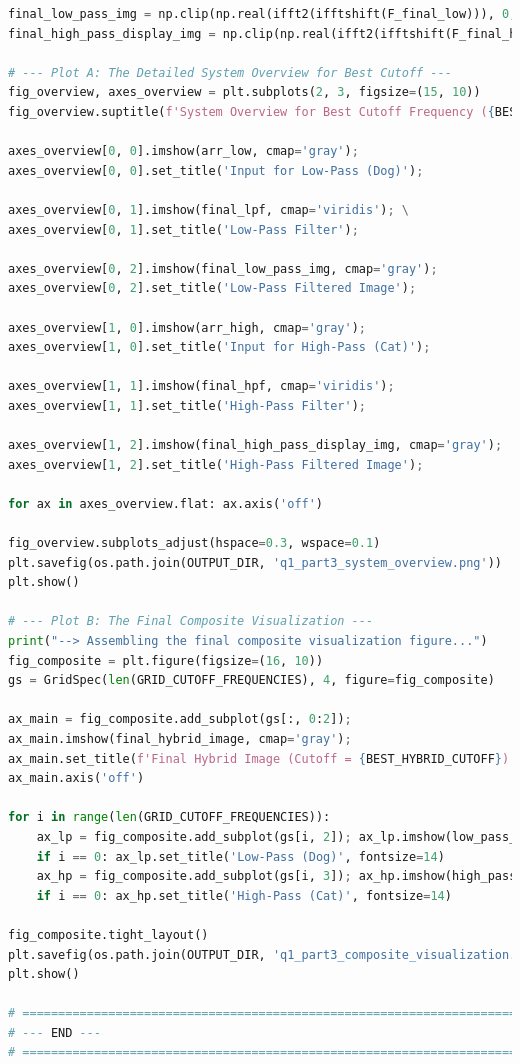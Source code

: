 \documentclass[11pt, a4paper]{article}
\begin{document}
\begin{lstlisting}[language=Python, caption={Python script for Question 1.}]
final_low_pass_img = np.clip(np.real(ifft2(ifftshift(F_final_low))), 0, 255)
final_high_pass_display_img = np.clip(np.real(ifft2(ifftshift(F_final_high))) + 128, 0, 255)

# --- Plot A: The Detailed System Overview for Best Cutoff ---
fig_overview, axes_overview = plt.subplots(2, 3, figsize=(15, 10))
fig_overview.suptitle(f'System Overview for Best Cutoff Frequency ({BEST_HYBRID_CUTOFF})', fontsize=16)

axes_overview[0, 0].imshow(arr_low, cmap='gray'); 
axes_overview[0, 0].set_title('Input for Low-Pass (Dog)');

axes_overview[0, 1].imshow(final_lpf, cmap='viridis'); \
axes_overview[0, 1].set_title('Low-Pass Filter');

axes_overview[0, 2].imshow(final_low_pass_img, cmap='gray'); 
axes_overview[0, 2].set_title('Low-Pass Filtered Image');

axes_overview[1, 0].imshow(arr_high, cmap='gray'); 
axes_overview[1, 0].set_title('Input for High-Pass (Cat)');

axes_overview[1, 1].imshow(final_hpf, cmap='viridis'); 
axes_overview[1, 1].set_title('High-Pass Filter');

axes_overview[1, 2].imshow(final_high_pass_display_img, cmap='gray'); 
axes_overview[1, 2].set_title('High-Pass Filtered Image');

for ax in axes_overview.flat: ax.axis('off')

fig_overview.subplots_adjust(hspace=0.3, wspace=0.1) 
plt.savefig(os.path.join(OUTPUT_DIR, 'q1_part3_system_overview.png'))
plt.show()

# --- Plot B: The Final Composite Visualization ---
print("--> Assembling the final composite visualization figure...")
fig_composite = plt.figure(figsize=(16, 10))
gs = GridSpec(len(GRID_CUTOFF_FREQUENCIES), 4, figure=fig_composite)

ax_main = fig_composite.add_subplot(gs[:, 0:2]); 
ax_main.imshow(final_hybrid_image, cmap='gray');
ax_main.set_title(f'Final Hybrid Image (Cutoff = {BEST_HYBRID_CUTOFF})', fontsize=16); 
ax_main.axis('off')

for i in range(len(GRID_CUTOFF_FREQUENCIES)):
    ax_lp = fig_composite.add_subplot(gs[i, 2]); ax_lp.imshow(low_pass_components[i], cmap='gray'); ax_lp.axis('off')
    if i == 0: ax_lp.set_title('Low-Pass (Dog)', fontsize=14)
    ax_hp = fig_composite.add_subplot(gs[i, 3]); ax_hp.imshow(high_pass_components[i], cmap='gray'); ax_hp.axis('off')
    if i == 0: ax_hp.set_title('High-Pass (Cat)', fontsize=14)

fig_composite.tight_layout()
plt.savefig(os.path.join(OUTPUT_DIR, 'q1_part3_composite_visualization.png'))
plt.show()

# ============================================================================
# --- END ---
# ============================================================================

\end{lstlisting}
\end{document}
